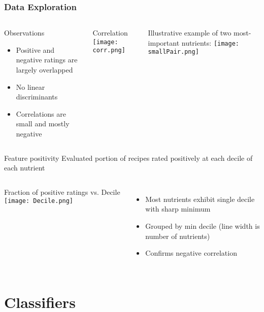 \documentclass{beamer}
\begin{document}
\begin{frame}
	\frametitle{Data Exploration}
	\begin{columns}[t]
		\column[T]{5cm}
		\begin{block}{Observations}
			\begin{itemize}
				\item Positive and negative ratings are largely overlapped
				\item No linear discriminants
				\item Correlations are small and mostly negative
			\end{itemize}
		\end{block}
		\begin{block}{Correlation}
			\texttt{[image: corr.png]}
		\end{block}
		
		\column[T]{5.5cm}
		\begin{block}{Illustrative example of two most-important nutrients:}
		\texttt{[image: smallPair.png]}
		\end{block}
		
	\end{columns}
	

\end{frame}


\begin{frame}{Feature positivity}
	Evaluated portion of recipes rated positively at each decile of each nutrient
	\begin{columns}[T]
		\column[T]{7.5cm}
		\begin{block}{Fraction of positive ratings vs. Decile}
		\texttt{[image: Decile.png]}
		\end{block}
	
		\column[T]{4cm}
		\begin{itemize}
			\item Most nutrients exhibit single decile with sharp minimum
			\item Grouped by min decile (line width is number of nutrients)
			\item Confirms negative correlation
		\end{itemize}
	\end{columns}
\end{frame}	

\section{Classifiers}
\end{document}
